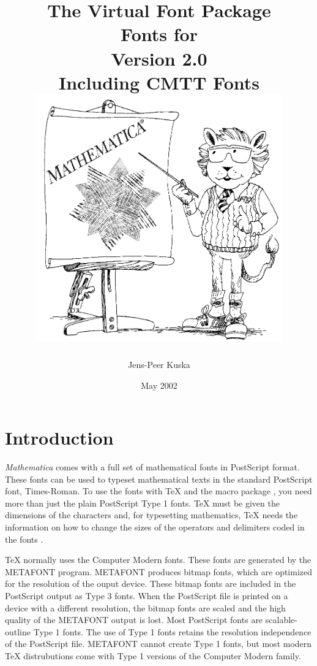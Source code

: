 \documentclass{article}
\providecommand{\metafont}{\textsf{METAFONT}\xspace}
\newcommand{\Math}{\textit{Mathematica}\xspace}
\begin{document}
 

\title{
The \MathLogo{} Virtual Font Package\\
\MathLogo{} Fonts for \LaTeXe{}\\
Version 2.0\\
Including CMTT Fonts\\
\includegraphics[width=0.8\textwidth]{fntpackcover}}
\date{May 2002}
\author{Jens-Peer Kuska}
\maketitle
\newpage
\tableofcontents
\newpage
\listoftables
\newpage
\section{Introduction}

\Math{} comes with a full set of mathematical fonts in PostScript
format. These fonts can be used to typeset mathematical texts in the
standard PostScript font, Times-Roman. To use the fonts with \TeX{}
and the macro package \LaTeXe{} \cite{LTeXComp}, you need more than
just the plain PostScript Type 1 fonts. \TeX{} must be given the
dimensions of the characters and, for typesetting mathematics, \TeX{}
needs the information on how to change the sizes of the operators and
delimiters coded in the fonts \cite{TeXBook}.

\TeX{} normally uses the Computer Modern fonts. These fonts are
generated by the \metafont program. \metafont produces bitmap fonts,
which are optimized for the resolution of the ouput device. These
bitmap fonts are included in the PostScript output as Type 3
fonts. When the PostScript file is printed on a device with a
different resolution, the bitmap fonts are scaled and the high quality
of the \metafont output is lost. Most PostScript fonts are
scalable-outline Type 1 fonts. The use of Type 1 fonts retains the
resolution independence of the PostScript file. \metafont cannot
create Type 1 fonts, but most modern \TeX{} distrubutions come with
Type 1 versions of the Computer Modern family.
\end{document}

